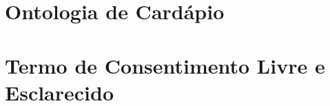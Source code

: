 \documentclass[portuguese,oneside]{tcc}
\begin{document}
		
		
		
		\appendix
		
		\chapter{\label{apnd:ontologia}Ontologia de Cardápio}
		
		\chapter{\label{apnd:tcle}Termo de Consentimento Livre e Esclarecido}
			
		
\end{document}
